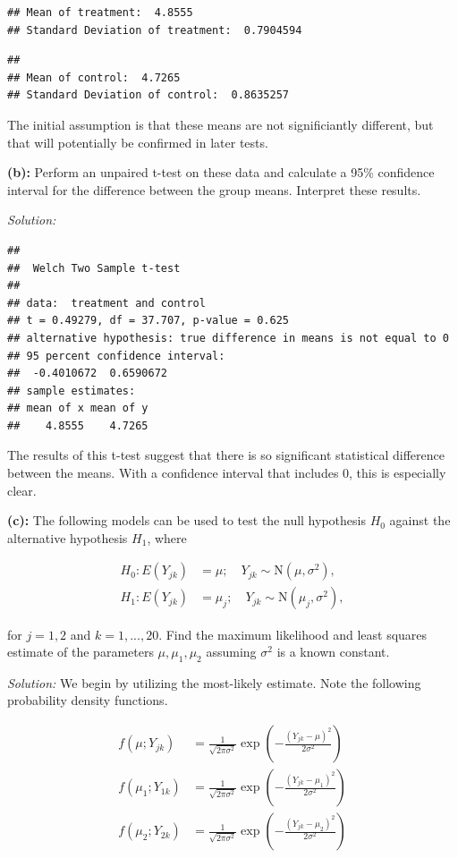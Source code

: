 \documentclass[]{article}
\begin{document}
\begin{verbatim}
## Mean of treatment:  4.8555 
## Standard Deviation of treatment:  0.7904594
\end{verbatim}

\begin{verbatim}
## 
## Mean of control:  4.7265 
## Standard Deviation of control:  0.8635257
\end{verbatim}

The initial assumption is that these means are not significiantly
different, but that will potentially be confirmed in later tests.

\textbf{(b):} Perform an unpaired t-test on these data and calculate a
95\% confidence interval for the difference between the group means.
Interpret these results.

\emph{Solution: }

\begin{verbatim}
## 
##  Welch Two Sample t-test
## 
## data:  treatment and control
## t = 0.49279, df = 37.707, p-value = 0.625
## alternative hypothesis: true difference in means is not equal to 0
## 95 percent confidence interval:
##  -0.4010672  0.6590672
## sample estimates:
## mean of x mean of y 
##    4.8555    4.7265
\end{verbatim}

The results of this t-test suggest that there is so significant
statistical difference between the means. With a confidence interval
that includes 0, this is especially clear.

\textbf{(c):} The following models can be used to test the null
hypothesis \(H_0\) against the alternative hypothesis \(H_1\), where

\begin{align*}
H_0 : E(Y_{jk}) &= \mu;\quad Y_{jk} \sim \text{N}(\mu, \sigma^2),\\
H_1 : E(Y_{jk}) &= \mu_j;\quad Y_{jk} \sim \text{N}(\mu_j, \sigma^2),
\end{align*}

for \(j = 1,2\) and \(k = 1,...,20\). Find the maximum likelihood and
least squares estimate of the parameters \(\mu, \mu_1, \mu_2\) assuming
\(\sigma^2\) is a known constant.

\emph{Solution: }We begin by utilizing the most-likely estimate. Note
the following probability density functions.

\begin{align*}
f(\mu; Y_{jk}) &= \frac{1}{\sqrt{2\pi\sigma^2}}\exp\left(-\frac{(Y_{jk} - \mu)^2}{2\sigma^2} \right)\\
f(\mu_1; Y_{1k}) &= \frac{1}{\sqrt{2\pi\sigma^2}}\exp\left(-\frac{(Y_{jk} - \mu_1)^2}{2\sigma^2} \right)\\
f(\mu_2; Y_{2k}) &= \frac{1}{\sqrt{2\pi\sigma^2}}\exp\left(-\frac{(Y_{jk} - \mu_2)^2}{2\sigma^2} \right)
\end{align*}
\end{document}
